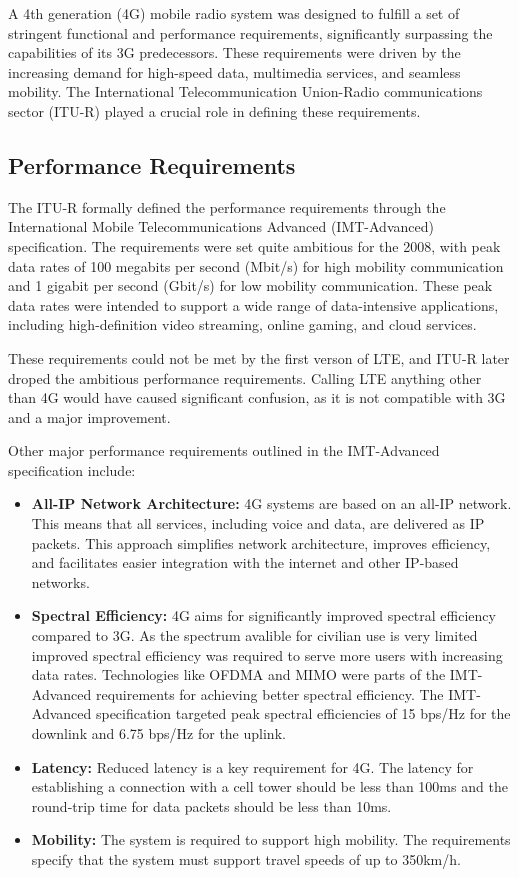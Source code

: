 A 4th generation (4G) mobile radio system was designed to fulfill a set of stringent functional and performance requirements, significantly surpassing the capabilities of its 3G predecessors. These requirements were driven by the increasing demand for high-speed data, multimedia services, and seamless mobility. The International Telecommunication Union-Radio communications sector (ITU-R) played a crucial role in defining these requirements.

\subsection{Performance Requirements}

The ITU-R formally defined the performance requirements through the International Mobile Telecommunications Advanced (IMT-Advanced) specification. The requirements were set quite ambitious for the 2008, with peak data rates of 100 megabits per second (Mbit/s) for high mobility communication and 1 gigabit per second (Gbit/s) for low mobility communication. These peak data rates were intended to support a wide range of data-intensive applications, including high-definition video streaming, online gaming, and cloud services.

These requirements could not be met by the first verson of LTE, and ITU-R later droped the ambitious performance requirements. Calling LTE anything other than 4G would have caused significant confusion, as it is not compatible with 3G and a major improvement.

Other major performance requirements outlined in the IMT-Advanced specification include:

\begin{itemize}
    \item \textbf{All-IP Network Architecture:} 4G systems are based on an all-IP network. This means that all services, including voice and data, are delivered as IP packets. This approach simplifies network architecture, improves efficiency, and facilitates easier integration with the internet and other IP-based networks.
    \item \textbf{Spectral Efficiency:} 4G aims for significantly improved spectral efficiency compared to 3G. As the spectrum avalible for civilian use is very limited improved spectral efficiency was required to serve more users with increasing data rates. Technologies like OFDMA and MIMO were parts of the IMT-Advanced requirements for achieving better spectral efficiency. The IMT-Advanced specification targeted peak spectral efficiencies of 15 bps/Hz for the downlink and 6.75 bps/Hz for the uplink.
    \item \textbf{Latency:} Reduced latency is a key requirement for 4G. The latency for establishing a connection with a cell tower should be less than 100ms and the round-trip time for data packets should be less than 10ms.
    \item \textbf{Mobility:} The system is required to support high mobility. The requirements specify that the system must support travel speeds of up to 350km/h.
\end{itemize}


